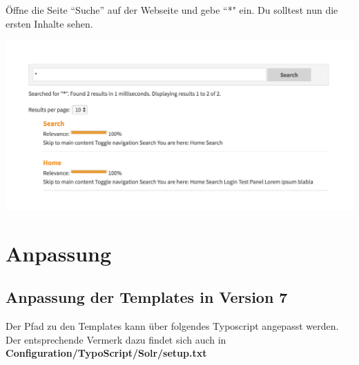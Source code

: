 \documentclass[]{book}
\begin{document}
Öffne die Seite ``Suche'' auf der Webseite und gebe ``*" ein. Du
solltest nun die ersten Inhalte sehen.

\includegraphics{images/searchresults.png}

\chapter{Anpassung}

\section{Anpassung der Templates in Version 7}

Der Pfad zu den Templates kann über folgendes Typoscript angepasst
werden. Der entsprechende Vermerk dazu findet sich auch in
\textbf{Configuration/TypoScript/Solr/setup.txt}
\end{document}

